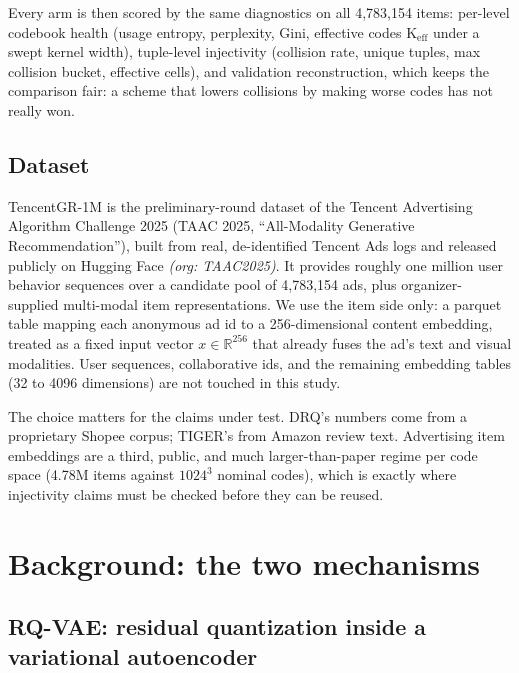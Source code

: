 \documentclass[11pt]{article}
\newcommand{\R}{\mathbb{R}}
\newcommand{\Keff}{\mathrm{K}_{\mathrm{eff}}}
\begin{document}
Every arm is then scored by the same diagnostics on all 4,783,154 items:
per-level codebook health (usage entropy, perplexity, Gini, effective codes
$\Keff$ under a swept kernel width), tuple-level injectivity (collision rate,
unique tuples, max collision bucket, effective cells), and validation
reconstruction, which keeps the comparison fair: a scheme that lowers collisions
by making worse codes has not really won.

\subsection{Dataset}

TencentGR-1M is the preliminary-round dataset of the Tencent Advertising
Algorithm Challenge 2025 (TAAC 2025, ``All-Modality Generative Recommendation''),
built from real, de-identified Tencent Ads logs and released publicly on
Hugging Face \emph{(org: TAAC2025)}. It provides roughly one million user
behavior sequences over a candidate pool of 4{,}783{,}154 ads, plus
organizer-supplied multi-modal item representations. We use the item side only:
a parquet table mapping each anonymous ad id to a 256-dimensional content
embedding, treated as a fixed input vector
$x \in \R^{256}$ that already fuses the ad's text and visual modalities. User
sequences, collaborative ids, and the remaining embedding tables (32 to 4096
dimensions) are not touched in this study.

The choice matters for the claims under test. DRQ's numbers come from a
proprietary Shopee corpus; TIGER's from Amazon review text. Advertising item
embeddings are a third, public, and much larger-than-paper regime per code space
(4.78M items against $1024^3$ nominal codes), which is exactly where
injectivity claims must be checked before they can be reused.

\section{Background: the two mechanisms}

\subsection{RQ-VAE: residual quantization inside a variational autoencoder}
\label{sec:rqvae}
\end{document}
